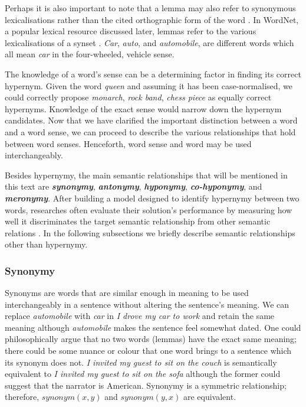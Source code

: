 Perhaps it is also important to note that a lemma may also refer to synonymous lexicalisations rather than the cited orthographic form of the word \citep{Jurafsky2009}.  In WordNet, a popular lexical resource discussed later, lemmas refer to the various lexicalisations of a \ac{synset} \citep{Miller1995}.  \textit{Car}, \textit{auto}, and \textit{automobile}, are different words which all mean \textit{car} in the four-wheeled, vehicle sense.  

The knowledge of a word’s sense can be a determining factor in finding its correct hypernym.  Given the word \textit{queen} and assuming it has been case-normalised, we could correctly propose \textit{monarch}, \textit{rock band}, \textit{chess piece} as equally correct hypernyms.   Knowledge of the exact sense would narrow down the hypernym candidates.  Now that we have clarified the important distinction between a word and a word sense, we can proceed to describe the various relationships that hold between word senses.  Henceforth, word sense and word may be used interchangeably.

Besides hypernymy, the main semantic relationships that will be mentioned in this text are \textbf{\textit{synonymy}}, \textbf{\textit{antonymy}}, \textbf{\textit{hyponymy}}, \textbf{\textit{co-hyponymy}}, and \textbf{\textit{meronymy}}.  After building a model designed to identify hypernymy between two words, researches often evaluate their solution’s performance by measuring how well it discriminates the target semantic relationship from other semantic relations \citep{shwartz2017siege, nguyen2017hierarchical, shwartz2016path}.  In the following subsections we briefly describe semantic relationships other than hypernymy.

\subsubsection{Synonymy}
Synonyms are words that are similar enough in meaning to be used interchangeably in a sentence without altering the sentence’s meaning.  We can replace \textit{automobile} with \textit{car} in \textit{I drove my car to work} and retain the same meaning although \textit{automobile} makes the sentence feel somewhat dated.  One could philosophically argue that no two words (lemmas) have the exact same meaning; there could be some nuance or colour that one word brings to a sentence which its synonym does not.  \textit{I invited my guest to sit on the couch} is semantically equivalent to \textit{I invited my guest to sit on the sofa} although the former could suggest that the narrator is American.  Synonymy is a symmetric relationship; therefore, \(synonym(x, y)\) and \(synonym(y, x)\) are equivalent.

